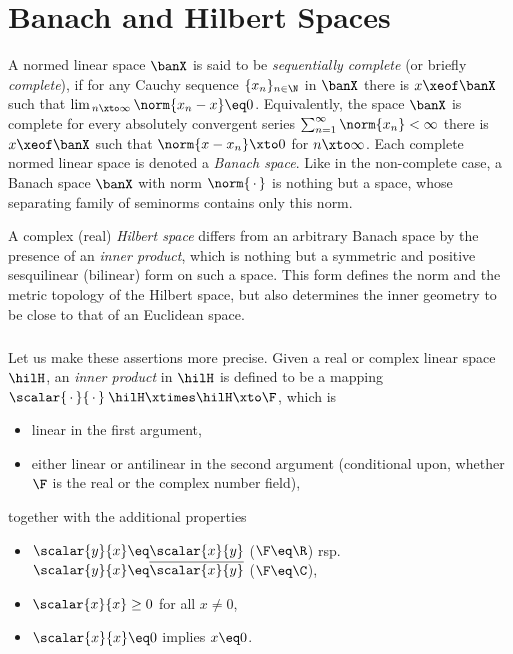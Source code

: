 \documentclass[11pt,twoside]{article}
\begin{document}
\section{Banach and Hilbert Spaces}
A normed linear space $\banX$ is said to be \textit{sequentially complete}
(or briefly \textit{complete}),
if for any Cauchy sequence $\{x_n\}_{n \in \N}$ in $\banX$
there is $x \xeof \banX$
such that $\lim_{\,n \xto \infty} \norm{x_n-x} \eq 0$.
Equivalently,
the space $\banX$ is complete
\iff
for every absolutely convergent series
$\sum_{n=1}^{\infty} \norm{x_n} < \infty$ there is $x \xeof \banX$
such that $\norm{x-x_n} \xto 0$ for $n \xto \infty$.
Each complete normed linear space is denoted a \textit{Banach space}.
Like in the non-complete case,
a Banach space $\banX$ with norm $\norm{\,\cdot\,}$
is nothing but a {\FRECHET} space,
whose separating family of seminorms contains only this norm.

A complex (real) \textit{Hilbert space} differs
from an arbitrary Banach space by the presence of an \textit{inner product},
which is nothing but a symmetric and positive sesquilinear (bilinear) form
on such a space.
This form defines the norm and the metric topology of the Hilbert space,
but also determines the inner geometry to be close
to that of an Euclidean space.

\subparagraph{} %
Let us make these assertions more precise.
Given a real or complex linear space $\hilH$,
an \textit{inner product} in $\hilH$ is defined to be a mapping
$\scalar{\,\cdot\,}{\,\cdot\,}\: \hilH \xtimes \hilH \xto \F$,
which is

\begin{itemize}[leftmargin=35pt]
\item[(I-1)]
linear in the first argument,

\item[(I-2)]
either linear or antilinear in the second argument (conditional upon,
whether $\F$ is the real or the complex number field),
\end{itemize}

together with the additional properties

\begin{itemize}[leftmargin=35pt]
\item[(I-3)]
$\scalar{y}{x} \eq           \scalar{x}{y}$  ($\F \eq \R$) rsp.
$\scalar{y}{x} \eq \overline{\scalar{x}{y}}$ ($\F \eq \C$),
\item[(I-4)]
$\scalar{x}{x} \geq 0$ for all $x \neq 0$,
\item[(I-5)]
$\scalar{x}{x} \eq 0$ implies $x \eq 0$.
\end{itemize}
\end{document}
